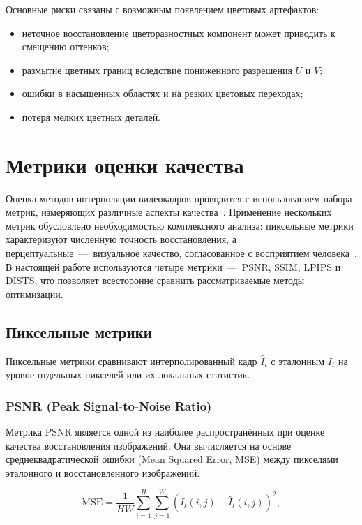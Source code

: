 Основные риски связаны с возможным появлением цветовых артефактов:
\begin{itemize}
	\item неточное восстановление цветоразностных компонент может приводить к смещению оттенков;
	\item размытие цветных границ вследствие пониженного разрешения $U$ и $V$;
	\item ошибки в насыщенных областях и на резких цветовых переходах;
	\item потеря мелких цветных деталей.
\end{itemize}

\section{Метрики оценки качества}

Оценка методов интерполяции видеокадров проводится с использованием набора метрик, измеряющих различные аспекты качества~\cite{kye2026acevfi}. Применение нескольких метрик обусловлено необходимостью комплексного анализа: пиксельные метрики характеризуют численную точность восстановления, а перцептуальные~---~визуальное качество, согласованное с восприятием человека~\cite{kye2026acevfi}. В настоящей работе используются четыре метрики~---~PSNR, SSIM, LPIPS и DISTS, что позволяет всесторонне сравнить рассматриваемые методы оптимизации.

\subsection*{Пиксельные метрики}

Пиксельные метрики сравнивают интерполированный кадр $\hat{I}_t$ с эталонным $I_t$ на уровне отдельных пикселей или их локальных статистик.

\subsubsection*{PSNR (Peak Signal-to-Noise Ratio)}

Метрика PSNR является одной из наиболее распространённых при оценке качества восстановления изображений. Она вычисляется на основе среднеквадратической ошибки (Mean Squared Error, MSE) между пикселями эталонного и восстановленного изображений:

\begin{equation}
	\text{MSE} = \frac{1}{HW} \sum_{i=1}^{H} \sum_{j=1}^{W} \left( I_t(i,j) - \hat{I}_t(i,j) \right)^2,
\end{equation}

